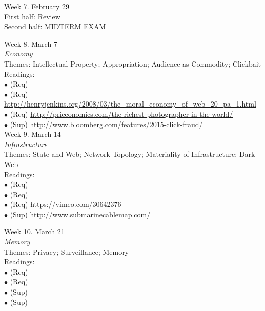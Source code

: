 \documentclass[10pt]{article}
\begin{document}
Week 7. February 29 \\
First half: Review \\
Second half: MIDTERM EXAM 

Week 8. March 7 \\
\textit{Economy} \\
Themes: Intellectual Property; Appropriation; Audience as Commodity; Clickbait \\
	Readings: \\
	$\bullet$ (Req) \\
	$\bullet$ (Req) \url{http://henryjenkins.org/2008/03/the_moral_economy_of_web_20_pa_1.html}\\
	$\bullet$ (Req) \url{http://priceonomics.com/the-richest-photographer-in-the-world/}\\
	$\bullet$ (Sup) \url{http://www.bloomberg.com/features/2015-click-fraud/}\\

Week 9. March 14 \\
\textit{Infrastructure} \\
Themes: State and Web; Network Topology; Materiality of Infrastructure; Dark Web \\
	Readings: \\
	$\bullet$ (Req) \\
	$\bullet$ (Req) \\
	$\bullet$ (Req) \url{https://vimeo.com/30642376}\\
	$\bullet$ (Sup) \url{http://www.submarinecablemap.com/}

Week 10. March 21 \\
\textit{Memory} \\
Themes: Privacy; Surveillance; Memory \\
	Readings: \\
	$\bullet$ (Req) \\
	$\bullet$ (Req) \\
	$\bullet$ (Sup) \\
	$\bullet$ (Sup) 
\end{document}
